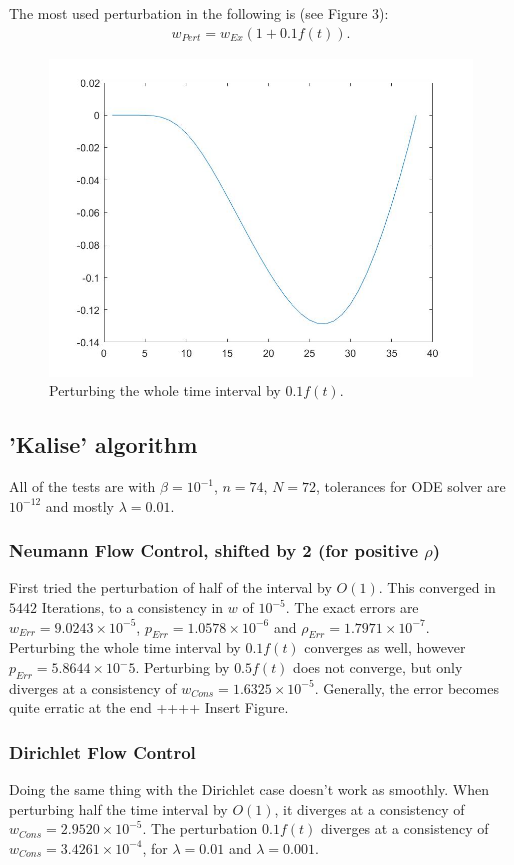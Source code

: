 \documentclass[11pt, a4paper]{article}
\theoremstyle{definition}
\begin{document}
The most used perturbation in the following is (see Figure 3):
\begin{align*}
w_{Pert} = w_{Ex} (1 + 0.1 f(t)).
\end{align*}
\begin{figure}[h]
	\includegraphics[scale=0.3]{wpertfull01.jpg}
	\caption{Perturbing the whole time interval by $0.1f(t)$.}
\end{figure}
\subsection*{'Kalise' algorithm}
All of the tests are with $\beta = 10^{-1}$, $n = 74$, $N=72$, tolerances for ODE solver are $10^{-12}$ and mostly $\lambda = 0.01$.
\subsubsection*{Neumann Flow Control, shifted by 2 (for positive $\rho$)}
First tried the perturbation of half of the interval by $O(1)$. This converged in $5442$ Iterations, to a consistency in $w$ of $10^{-5}$. The exact errors are $w_{Err}= 9.0243 \times 10^{-5}$, $p_{Err} = 1.0578 \times 10^{-6}$ and $\rho_{Err} = 1.7971 \times 10^{-7}$.\\
Perturbing the whole time interval by $0.1 f(t)$ converges as well, however $p_{Err} = 5.8644 \times 10^-5$. Perturbing by $0.5 f(t)$ does not converge, but only diverges at a consistency of $w_{Cons} = 1.6325 \times 10^{-5}$.
Generally, the error becomes quite erratic at the end ++++ Insert Figure.
\subsubsection*{Dirichlet Flow Control}
 Doing the same thing with the Dirichlet case doesn't work as smoothly. When perturbing half the time interval by $O(1)$, it diverges at a consistency of $w_{Cons} = 2.9520 \times 10^{-5}$. The perturbation $0.1f(t)$ diverges at a consistency of $w_{Cons} = 3.4261 \times 10^{-4}$, for $\lambda = 0.01$ and $\lambda = 0.001$. 
\end{document}

